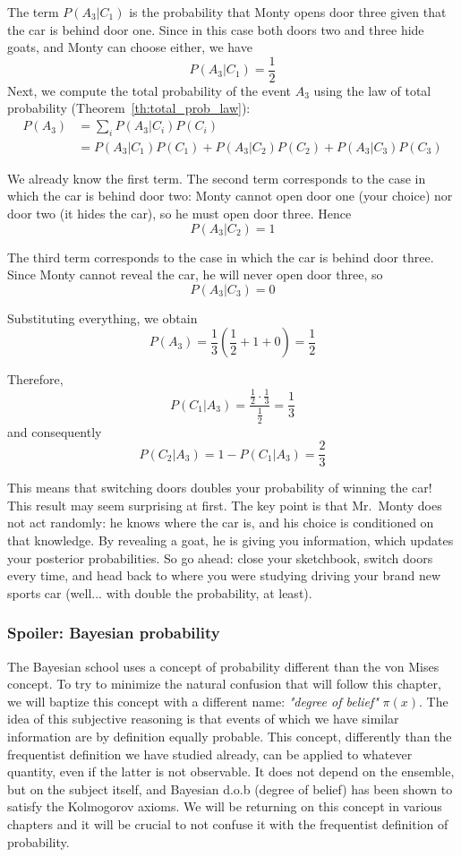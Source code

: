 \begin{example}
	The term $P(A_3|C_1)$ is the probability that Monty opens door three given that the car is behind door one. Since in this case both doors two and three hide goats, and Monty can choose either, we have
	\[
	P(A_3|C_1)=\frac{1}{2}
	\]
	Next, we compute the total probability of the event $A_3$ using the law of total probability (Theorem~\ref{th:total_prob_law}):
	\begin{align*}
		P(A_3)
		&=\sum_i P(A_3|C_i)P(C_i)\\
		&=P(A_3|C_1)P(C_1)+P(A_3|C_2)P(C_2)+P(A_3|C_3)P(C_3)
	\end{align*}
	
	We already know the first term. The second term corresponds to the case in which the car is behind door two: Monty cannot open door one (your choice) nor door two (it hides the car), so he must open door three. Hence
	\[
	P(A_3|C_2)=1
	\]
	
	The third term corresponds to the case in which the car is behind door three. Since Monty cannot reveal the car, he will never open door three, so
	\[
	P(A_3|C_3)=0
	\]
	
	Substituting everything, we obtain
	\[
	P(A_3)=\frac{1}{3}\left(\frac{1}{2}+1+0\right)=\frac{1}{2}
	\]
	
	Therefore,
	\[
	P(C_1|A_3)=\frac{\frac{1}{2}\cdot\frac{1}{3}}{\frac{1}{2}}=\frac{1}{3}
	\]
	and consequently
	\[
	P(C_2|A_3)=1-P(C_1|A_3)=\frac{2}{3}
	\]
	
	This means that switching doors doubles your probability of winning the car!
	This result may seem surprising at first. The key point is that Mr.~Monty does not act randomly: he knows where the car is, and his choice is conditioned on that knowledge. By revealing a goat, he is giving you information, which updates your posterior probabilities.
	So go ahead: close your sketchbook, switch doors every time, and head back to where you were studying driving your brand new sports car (well... with double the probability, at least).
\end{example}


\subsubsection{Spoiler: Bayesian probability}
\label{subsubsec:Bayes}

The Bayesian school uses a concept of probability different than the von Mises concept. To try to minimize the natural confusion that will follow this chapter, we will baptize this concept with a different name: \emph{"degree of belief"} $\pi(x)$. The idea of this subjective reasoning is that events of which we have similar information are by definition equally probable. This concept, differently than the frequentist definition we have studied already, can be applied to whatever quantity, even if the latter is not observable. It does not depend on the ensemble, but on the subject itself, and Bayesian d.o.b (degree of belief) has been shown to satisfy the Kolmogorov axioms. We will be returning on this concept in various chapters and it will be crucial to not confuse it with the frequentist definition of probability. 

